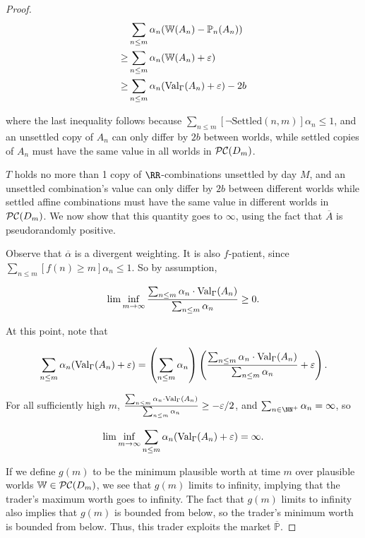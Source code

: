 \documentclass[authordate,onecolumn,noenvironments]{miri-tech-article}
\numberwithin{equation}{subsection}
\newcommand{\seq}[1]{{\overline{#1}}}
\newcommand{\nn}{n}
\newcommand{\deff}{f}
\newcommand{\alphas}{\seq{{\alpha}}}
\newcommand{\aff}{A}
\newcommand{\affs}{\seq\aff}
\newcommand{\BelState}{\mathbb{P}}
\newcommand{\pt}{\BelState}
\newcommand{\MP}{\seq{\pt}}
\newcommand{\dt}{D}
\newcommand{\pcworlds}{\mathcal{P\-C}}
\newcommand{\World}{\mathbb{W}}
\newcommand{\Theory}{\Gamma}
\newcommand{\thmval}[1][\Theory]{\operatorname{Val}_{#1}\-} %
\begin{document}
\begin{proof}
\begin{align*}
& \sum_{\nn \leq m} \alpha_\nn (\World(\aff_\nn) - \pt_\nn(\aff_\nn))
\\
\geq &
\sum_{\nn \leq m} \alpha_\nn  (\World(\aff_\nn) + \varepsilon)
\\
\geq &
\sum_{\nn \leq m} \alpha_\nn  (\thmval(\aff_\nn) + \varepsilon) - 2b
\end{align*}

where the last inequality follows because $\sum_{n \leq m} [ \neg \mathrm{Settled}(n, m) ] \alpha_n \leq 1$, and an unsettled copy of $\aff_n$ can only differ by $2b$ between worlds, while settled copies of $\aff_n$ must have the same value in all worlds in $\pcworlds(\dt_m)$.

$T$ holds no more than 1 copy of $\RR$-combinations unsettled by day $M$, and an unsettled combination's value can only differ by $2b$ between different worlds while settled affine combinations must have the same value in different worlds in $\pcworlds(\dt_m)$.  We now show that this quantity goes to $\infty$, using the fact that $\affs$ is pseudorandomly positive.

Observe that $\alphas$ is a divergent weighting.  It is also $\deff$-patient, since $\sum_{n \leq m} [\deff(n) \geq m] \alpha_n \leq 1$.   So by assumption,

\[ \lim\inf_{m\rightarrow\infty}
\frac{\sum_{\nn \leq m}\alpha_\nn \cdot \thmval(\aff_\nn)}
{\sum_{\nn\leq m}\alpha_\nn } \geq 0. \]

At this point, note that

\[ \sum_{\nn \leq m} \alpha_n (\thmval(\aff_n) + \varepsilon) = 
  \left(\sum_{n \leq m} \alpha_n\right) 
  \left( \frac{\sum_{\nn \leq m}\alpha_\nn \cdot \thmval(\aff_\nn)}{\sum_{\nn\leq m}\alpha_\nn }
    + \varepsilon
  \right). \]

  For all sufficiently high $m$, $\frac{\sum_{\nn \leq m}\alpha_\nn \cdot \thmval(\aff_\nn)}{\sum_{\nn\leq m}\alpha_\nn } \geq -\varepsilon/2$, and $\sum_{n \in \NN^+} \alpha_n = \infty$, so

\[ \lim\inf_{m\rightarrow\infty} \sum_{\nn \leq m} \alpha_\nn (\thmval(\aff_\nn) + \varepsilon) =\infty.\]

If we define $g(m)$ to be the minimum plausible worth at time $m$ over plausible worlds $\World\in\pcworlds(\dt_m)$, we see that $g(m)$ limits to infinity, implying that the trader's maximum worth goes to infinity.  The fact that $g(m)$ limits to infinity also implies that $g(m)$ is bounded from below, so the trader's minimum worth is bounded from below.  Thus, this trader exploits the market $\MP$.

\end{proof}
\end{document}
